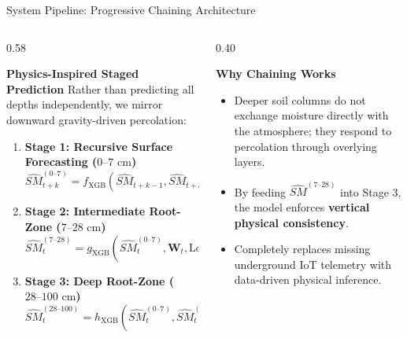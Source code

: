 \documentclass[aspectratio=169, 10pt]{beamer}
\begin{document}
\begin{frame}{System Pipeline: Progressive Chaining Architecture}
    \begin{columns}
        \begin{column}{0.58\textwidth}
            \begin{block}{\textbf{Physics-Inspired Staged Prediction}}
                \footnotesize
                Rather than predicting all depths independently, we mirror downward gravity-driven percolation:
                \vspace{0.15cm}
                \begin{enumerate}
                    \item \textbf{Stage 1: Recursive Surface Forecasting ($0\text{--}7\text{ cm}$)}
                    \vspace{0.05cm}
                    $$\widehat{SM}_{t+k}^{(0\text{--}7)} = f_{\text{XGB}}\left(\widehat{SM}_{t+k-1}, \widehat{SM}_{t+k-2}, \mathbf{W}_{t+k}^{\text{fc}}, k\right)$$
                    \item \textbf{Stage 2: Intermediate Root-Zone ($7\text{--}28\text{ cm}$)}
                    \vspace{0.05cm}
                    $$\widehat{SM}_{t}^{(7\text{--}28)} = g_{\text{XGB}}\left(\widehat{SM}_{t}^{(0\text{--}7)}, \mathbf{W}_{t}, \text{LongMemory}_{t}\right)$$
                    \item \textbf{Stage 3: Deep Root-Zone ($28\text{--}100\text{ cm}$)}
                    \vspace{0.05cm}
                    $$\widehat{SM}_{t}^{(28\text{--}100)} = h_{\text{XGB}}\left(\widehat{SM}_{t}^{(0\text{--}7)}, \widehat{SM}_{t}^{(7\text{--}28)}, \mathbf{W}_{t}, \text{LongMemory}_{t}\right)$$
                \end{enumerate}
            \end{block}
        \end{column}
        \begin{column}{0.40\textwidth}
            \begin{exampleblock}{\textbf{Why Chaining Works}}
                \footnotesize
                \begin{itemize}
                    \item Deeper soil columns do not exchange moisture directly with the atmosphere; they respond to percolation through overlying layers.
                    \item By feeding $\widehat{SM}^{(7\text{--}28)}$ into Stage 3, the model enforces \textbf{vertical physical consistency}.
                    \item Completely replaces missing underground IoT telemetry with data-driven physical inference.
                \end{itemize}
            \end{exampleblock}
        \end{column}
    \end{columns}
\end{frame}
\end{document}
